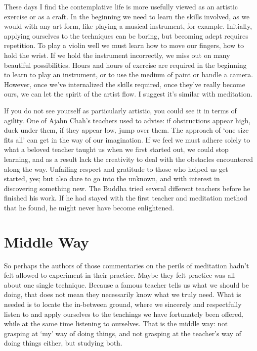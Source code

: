 These days I find the contemplative life is more usefully viewed as an
artistic exercise or as a craft. In the beginning we need to learn the
skills involved, as we would with any art form, like playing a musical
instrument, for example. Initially, applying ourselves to the techniques
can be boring, but becoming adept requires repetition. To play a violin
well we must learn how to move our fingers, how to hold the wrist. If we
hold the instrument incorrectly, we miss out on many beautiful
possibilities. Hours and hours of exercise are required in the beginning
to learn to play an instrument, or to use the medium of paint or handle
a camera. However, once we’ve internalized the skills required, once
they’ve really become ours, we can let the spirit of the artist flow. I
suggest it’s similar with meditation.

If you do not see yourself as particularly artistic, you could see it in
terms of agility. One of Ajahn Chah’s teachers used to advise: if
obstructions appear high, duck under them, if they appear low, jump over
them. The approach of ‘one size fits all’ can get in the way of our
imagination. If we feel we must adhere solely to what a beloved teacher
taught us when we first started out, we could stop learning, and as a
result lack the creativity to deal with the obstacles encountered along
the way. Unfailing respect and gratitude to those who helped us get
started, yes; but also dare to go into the unknown, and with interest in
discovering something new. The Buddha tried several different teachers
before he finished his work. If he had stayed with the first teacher and
meditation method that he found, he might never have become enlightened.

\section{Middle Way}

So perhaps the authors of those commentaries on the perils of meditation
hadn’t felt allowed to experiment in their practice. Maybe they felt
practice was all about one single technique. Because a famous teacher
tells us what we should be doing, that does not mean they necessarily
know what we truly need. What is needed is to locate the in-between
ground, where we sincerely and respectfully listen to and apply
ourselves to the teachings we have fortunately been offered, while at
the same time listening to ourselves. That is the middle way: not
grasping at ‘my’ way of doing things, and not grasping at the teacher’s
way of doing things either, but studying both.

